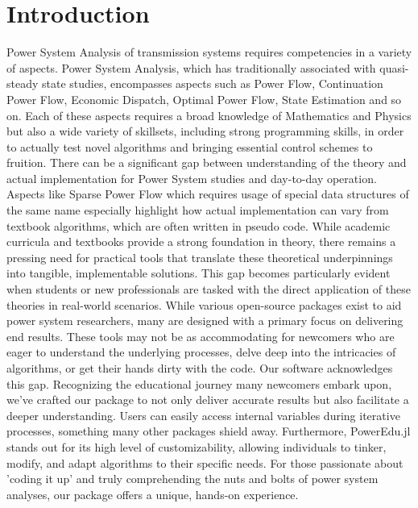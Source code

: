 \documentclass[varwidth]{standalone}
\providecommand{\packageName}[1]{PowerEdu.jl}
\begin{document}
\section{Introduction}
Power System Analysis of transmission systems requires competencies in
a variety of aspects. Power System Analysis, which has traditionally associated with quasi-steady
state studies, encompasses aspects such as Power Flow,
Continuation Power Flow, Economic Dispatch, Optimal Power Flow,
State Estimation and so on. Each of these aspects requires a broad knowledge of
Mathematics and Physics but also a wide variety of skillsets, including
strong programming skills, in order to actually test novel algorithms
and bringing essential control schemes to fruition. There can be a significant
gap between understanding of the theory and actual implementation for Power
System studies and day-to-day operation. Aspects like Sparse Power Flow
which requires usage of special data structures of the same name especially highlight
how actual implementation can vary from textbook algorithms, which are often
written in pseudo code. While academic curricula and textbooks provide a strong
foundation in theory, there remains a pressing need for practical tools that
translate these theoretical underpinnings into tangible, implementable solutions.
This gap becomes particularly evident when students or new professionals are
tasked with the direct application of these theories in real-world scenarios.
While various open-source packages exist to aid power system researchers, many are designed with a primary focus on delivering end results. These tools may not be as accommodating for newcomers who are eager to understand the underlying processes, delve deep into the intricacies of algorithms, or get their hands dirty with the code. Our software acknowledges this gap. Recognizing the educational journey many newcomers embark upon, we've crafted our package to not only deliver accurate results but also facilitate a deeper understanding. Users can easily access internal variables during iterative processes, something many other packages shield away. Furthermore, \packageName{} stands out for its high level of customizability, allowing individuals to tinker, modify, and adapt algorithms to their specific needs. For those passionate about 'coding it up' and truly comprehending the nuts and bolts of power system analyses, our package offers a unique, hands-on experience.
\end{document}
